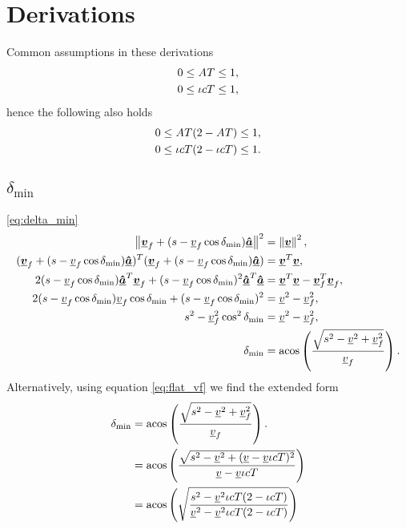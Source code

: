 \section{Derivations}
\label{app:derivations}
Common assumptions in these derivations
\begin{align}
\label{eq:assump_accel_1}
0 \le \mathmakebox[\widthof{$\iota c$}]{A}T \le 1,\\
\label{eq:assump_friction_1}
0 \le \iota cT \le 1,
\end{align}
hence the following also holds
\begin{align}
\label{eq:assump_accel_2}
0 \le \mathmakebox[\widthof{$\iota c$}]{A}T (2 - \mathmakebox[\widthof{$\iota c$}]{A} T) \le 1,\\
\label{eq:assump_friction_2}
0 \le \iota cT(2 - \iota cT) \le 1.
\end{align}

\subsection{$\delta_{\min}$}
\eqref{eq:delta_min}
\begin{align*}
\norm{\vec{\flat{v}}_f + (s - \flat{v}_f \cos\delta_{\min})\uvec{\flat{a}}}^2 &= \norm{\vec{\flat{v}}}^2,\\
(\vec{\flat{v}}_f + (s - \flat{v}_f \cos\delta_{\min})\uvec{\flat{a}})^T (\vec{\flat{v}}_f + (s - \flat{v}_f \cos\delta_{\min})\uvec{\flat{a}}) &= \vec{\flat{v}}^T \vec{\flat{v}},\\
2(s - \flat{v}_f \cos\delta_{\min}) \uvec{\flat{a}}^T \vec{\flat{v}}_f + (s - \flat{v}_f \cos\delta_{\min})^2 \uvec{\flat{a}}^T \uvec{\flat{a}} &= \vec{\flat{v}}^T \vec{\flat{v}} - \vec{\flat{v}}_f^T \vec{\flat{v}}_f,\\
2(s - \flat{v}_f \cos\delta_{\min}) \flat{v}_f \cos\delta_{\min} + (s - \flat{v}_f \cos\delta_{\min})^2 &= \flat{v}^2 - \flat{v}_f^2,\\
s^2 - \flat{v}_f^2 \cos^2\delta_{\min} &= \flat{v}^2 - \flat{v}_f^2,\\
\delta_{\min} &= \acos\left(\frac{\sqrt{s^2 - \flat{v}^2 + \flat{v}_f^2}}{\flat{v}_f} \right).
\end{align*}
Alternatively, using equation \eqref{eq:flat_vf} we find the extended form
\begin{align*}
\delta_{\min} &= \acos\left(\frac{\sqrt{s^2 - \flat{v}^2 + \flat{v}_f^2}}{\flat{v}_f} \right).\\
&= \acos\left(\frac{\sqrt{s^2 - \flat{v}^2 + (\flat{v} - \flat{v}\iota cT)^2}}{\flat{v} - \flat{v}\iota cT} \right)\\
&= \acos\left(\sqrt{\frac{s^2 - \flat{v}^2\iota cT(2 - \iota cT)}{\flat{v}^2 - \flat{v}^2\iota cT(2 - \iota cT)}} \right)\\
\end{align*}

